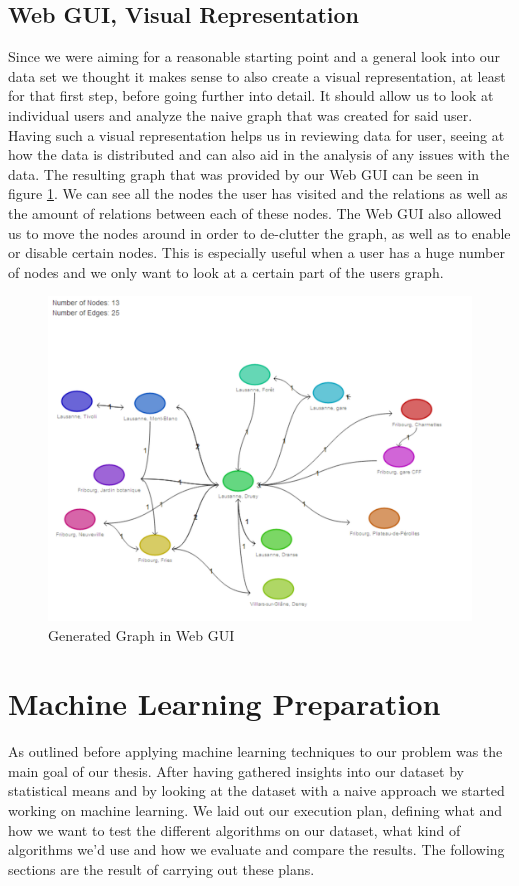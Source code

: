 \subsection{Web GUI, Visual Representation}
\label{subsec:web_gui}
Since we were aiming for a reasonable starting point and a general look into our data set we thought it makes sense to also create a visual representation, at least for that first step, before going further into detail. It should allow us to look at individual users and analyze the naive graph that was created for said user. Having such a visual representation helps us in reviewing data for user, seeing at how the data is distributed and can also aid in the analysis of any issues with the data. The resulting graph that was provided by our Web GUI can be seen in figure \ref{figure:web_gui_graph}. We can see all the nodes the user has visited and the relations as well as the amount of relations between each of these nodes. The Web GUI also allowed us to move the nodes around in order to de-clutter the graph, as well as to enable or disable certain nodes. This is especially useful when a user has a huge number of nodes and we only want to look at a certain part of the users graph.

\begin{figure}[!ht]
	\centering
	\includegraphics[width=1.0\textwidth]{images/web-gui}
	\caption{Generated Graph in Web GUI}
	\label{figure:web_gui_graph}
\end{figure}

\section{Machine Learning Preparation}
\label{sec:machine_learning_results}
As outlined before applying machine learning techniques to our problem was the main goal of our thesis. After having gathered insights into our dataset by statistical means and by looking at the dataset with a naive approach we started working on machine learning. We laid out our execution plan, defining what and how we want to test the different algorithms on our dataset, what kind of algorithms we'd use and how we evaluate and compare the results. The following sections are the result of carrying out these plans.

